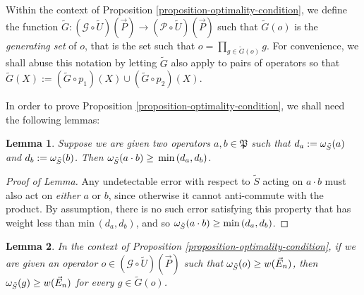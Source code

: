 \documentclass[twocolumn,showpacs,preprintnumbers,amsmath,amssymb,nofootinbib,pra,floatfix]{revtex4-1}
\newtheorem{lemma}{Lemma}
\newenvironment{definition}[1][Definition]{\begin{trivlist}
\item[\hskip \labelsep {\bfseries #1}]}{\end{trivlist}}
\newcommand{\lst}{\vec}
\newcommand{\set}{\tilde}
\newcommand{\genfun}{\mathcal{G}}
\newcommand{\pauligroup}{\mathfrak{P}}
\newcommand{\powerset}{\mathcal{P}}
\begin{document}
\begin{definition}
Within the context of Proposition \ref{proposition-optimality-condition}, we define the function $\set G:(\genfun\circ\set U)(\lst P)\to(\powerset\circ\set U)(\lst P)$ such that $\set G(o)$ is the \emph{generating set} of $o$, that is the set such that $o=\prod_{g\in\set G(o)} g$.  For convenience, we shall abuse this notation by letting $\set G$ also apply to pairs of operators so that $\set G(X):=(\set G\circ p_1)(X)\cup(\set G\circ p_2)(X).$
\end{definition}
In order to prove Proposition \ref{proposition-optimality-condition}, we shall need the following lemmas:
\begin{lemma}
\label{combinations-can't-make-things-worse}
Suppose we are given two operators $a,b\in\pauligroup$ such that $d_a:=\om_{\set S}(a)$ and $d_b:=\om_{\set S}(b)$.  Then $\om_{\set S}(a\cdot b) \ge \text{\min}\,(d_a,d_b)$.
\end{lemma}

\begin{proof}[Proof of Lemma]
Any undetectable error with respect to $\set S$ acting on $a\cdot b$ must also act on \emph{either} $a$ or $b$, since otherwise it cannot anti-commute with the product.  By assumption, there is no such error satisfying this property that has weight less than $\text{min}\,(d_a,d_b)$, and so $\om_{\set S}(a\cdot b) \ge \text{min}\,(d_a,d_b)$.
\end{proof}
\begin{lemma}
\label{combinations-can't-make-things-better}
In the context of Proposition \ref{proposition-optimality-condition}, if we are given an operator $o\in (\genfun\circ\set U)(\lst P)$ such that $\om_{\set S}(o)\ge w(\lst E_n)$, then $\om_{\set S}(g)\ge w(\lst E_n)$ for every $g\in\set G(o)$.
\end{lemma}
\end{document}
